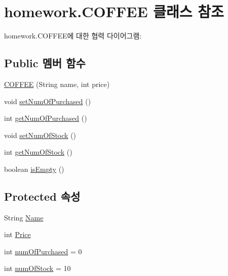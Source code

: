 \hypertarget{classhomework_1_1_c_o_f_f_e_e}{}\section{homework.\+C\+O\+F\+F\+EE 클래스 참조}
\label{classhomework_1_1_c_o_f_f_e_e}


homework.\+C\+O\+F\+F\+E\+E에 대한 협력 다이어그램\+:
\subsection*{Public 멤버 함수}
\begin{DoxyCompactItemize}
\item 
\hyperlink{classhomework_1_1_c_o_f_f_e_e_a189d7104d44cafd51f79197ee78ce986}{C\+O\+F\+F\+EE} (String name, int price)
\item 
void \hyperlink{classhomework_1_1_c_o_f_f_e_e_abe532b5d3c2f5401d6f18ddedeefa505}{set\+Num\+Of\+Purchased} ()
\item 
int \hyperlink{classhomework_1_1_c_o_f_f_e_e_afb2fa0fbf5fd13c0b6d93e00a03b5975}{get\+Num\+Of\+Purchased} ()
\item 
void \hyperlink{classhomework_1_1_c_o_f_f_e_e_ac10cce7c4f1098d8dd7b2f9faa0aaf35}{set\+Num\+Of\+Stock} ()
\item 
int \hyperlink{classhomework_1_1_c_o_f_f_e_e_a27f5ddb5dd1d8fa3131356b3bb722635}{get\+Num\+Of\+Stock} ()
\item 
boolean \hyperlink{classhomework_1_1_c_o_f_f_e_e_a1af610078b38adfccbd6403d7f08fd47}{is\+Empty} ()
\end{DoxyCompactItemize}
\subsection*{Protected 속성}
\begin{DoxyCompactItemize}
\item 
String \hyperlink{classhomework_1_1_c_o_f_f_e_e_a219259b70d681344d28ef25a006c4b00}{Name}
\item 
int \hyperlink{classhomework_1_1_c_o_f_f_e_e_a8b1ac1950929ce32fcd8bcc601560546}{Price}
\item 
int \hyperlink{classhomework_1_1_c_o_f_f_e_e_aaa96b0e75eeba86edff39e4f167fcd35}{num\+Of\+Purchased} = 0
\item 
int \hyperlink{classhomework_1_1_c_o_f_f_e_e_a67a941996cd461c1e4aefd5aeb110ba9}{num\+Of\+Stock} = 10
\end{DoxyCompactItemize}


